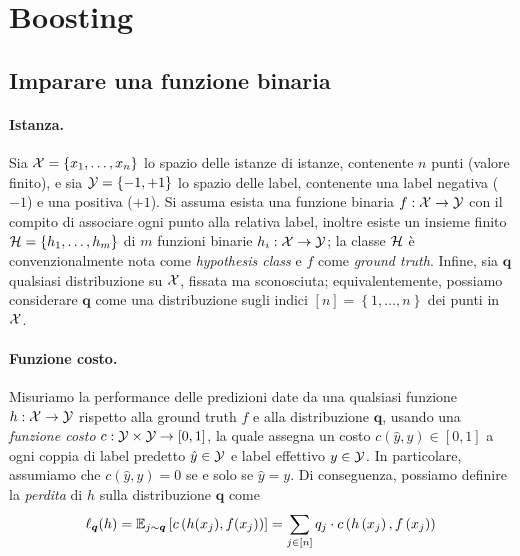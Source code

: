 \section{Boosting}

\subsection*{Imparare una funzione binaria}

\paragraph{Istanza.} Sia $\mathcal{X} = \left\{x_1, \dots, x_n \right\}$ lo spazio delle istanze di istanze, contenente $n$ punti (valore finito), e sia $\mathcal{Y} = \left\{-1, +1\right\}$ lo spazio delle label, contenente una label negativa ($-1$) e una positiva ($+1$). Si assuma esista una funzione binaria $f: \mathcal{X} \rightarrow \mathcal{Y}$ con il compito di associare ogni punto alla relativa label, inoltre esiste un insieme finito $\mathcal{H} = \left\{h_1, \dots, h_m\right\}$ di $m$ funzioni binarie $h_i : \mathcal{X} \rightarrow \mathcal{Y}$; la classe $\mathcal{H}$ è convenzionalmente nota come \textit{hypothesis class} e $f$ come \textit{ground truth}. Infine, sia $\bm q$ qualsiasi distribuzione su $\mathcal{X}$, fissata ma sconosciuta; equivalentemente, possiamo considerare $\bm q$ come una distribuzione sugli indici $[n] = \left\{1, \dots, n\right\}$ dei punti in $\mathcal{X}$.

\paragraph{Funzione costo.} Misuriamo la performance delle predizioni date da una qualsiasi funzione $h: \mathcal{X} \rightarrow \mathcal{Y}$ rispetto alla ground truth $f$ e alla distribuzione $\bm q$, usando una \textit{funzione costo} $c: \mathcal{Y} \times \mathcal{Y} \rightarrow [0,1]$, la quale assegna un costo $c \left(\hat y, y\right) \in [0,1]$ a ogni coppia di label predetto $\hat y \in \mathcal{Y}$ e label effettivo $y \in \mathcal{Y}$. In particolare, assumiamo che $c (\hat y, y) = 0$ se e solo se $\hat y = y$. Di conseguenza, possiamo definire la \textit{perdita} di $h$ sulla distribuzione $\bm q$ come
$$ \ell_{\bm q} (h) = \mathbb{E}_{j \sim \bm q} \left[c \left(h(x_j), f(x_j)\right)\right] = \sum_{j \in [n]} q_j \cdot c \left(h\left(x_j\right), f \left(x_j \right)\right)$$

